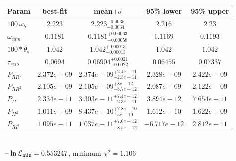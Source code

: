 \begin{tabular}{|l|c|c|c|c|} 
 \hline 
Param & best-fit & mean$\pm\sigma$ & 95\% lower & 95\% upper \\ \hline 
$100~\omega_{b }$ &$2.223$ & $2.223_{-0.0034}^{+0.0035}$ & $2.216$ & $2.23$ \\ 
$\omega_{cdm }$ &$0.1181$ & $0.1181_{-0.00058}^{+0.00063}$ & $0.1169$ & $0.1193$ \\ 
$100*\theta_{s }$ &$1.042$ & $1.042_{-0.00013}^{+0.00013}$ & $1.042$ & $1.042$ \\ 
$\tau_{reio }$ &$0.0694$ & $0.06904_{-0.0022}^{+0.0021}$ & $0.06455$ & $0.07337$ \\ 
$P_{{RR}^1 }$ &$2.372e-09$ & $2.374e-09_{-2.3e-11}^{+2.4e-11}$ & $2.328e-09$ & $2.422e-09$ \\ 
$P_{{RR}^2 }$ &$2.105e-09$ & $2.105e-09_{-8.7e-12}^{+8e-12}$ & $2.087e-09$ & $2.122e-09$ \\ 
$P_{{II}^1 }$ &$2.334e-11$ & $3.303e-11_{-2.3e-11}^{+7.4e-12}$ & $3.894e-12$ & $7.654e-11$ \\ 
$P_{{II}^2 }$ &$1.011e-09$ & $8.437e-10_{-5e-10}^{+2.8e-10}$ & $1.612e-10$ & $1.622e-09$ \\ 
$P_{{RI}^1 }$ &$1.095e-11$ & $1.037e-11_{-8.5e-12}^{+7.6e-12}$ & $-6.717e-12$ & $2.812e-11$ \\ 
\hline 
 \end{tabular} \\ 
$-\ln{\cal L}_\mathrm{min} =0.553247$, minimum $\chi^2=1.106$ \\ 
